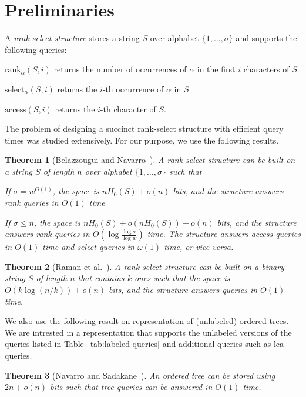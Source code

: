 \documentclass[12pt]{article}
\newtheorem{theorem}{Theorem}
\newcommand{\lcab}{\mathrm{lca}}
\newcommand{\rank}[3]{\mathrm{rank}_{#1}(#2,#3)}
\newcommand{\select}[3]{\mathrm{select}_{#1}(#2,#3)}
\newcommand{\access}[2]{\mathrm{access}(#1,#2)}
\newcommand{\range}[2]{\{#1,\ldots,#2\}}
\begin{document}
\section{Preliminaries}
A \emph{rank-select structure} stores a string $S$ over alphabet
$\range{1}{\sigma}$ and supports the following queries:
\begin{inparaenum}[(1)]
\item
$\rank{\alpha}{S}{i}$ returns the number of occurrences of $\alpha$ in the first
$i$ characters of $S$
\item
$\select{\alpha}{S}{i}$ returns the $i$-th occurrence of $\alpha$ in $S$
\item
$\access{S}{i}$ returns the $i$-th character of $S$.
\end{inparaenum}
The problem of designing a succinct rank-select structure with efficient query
times was studied extensively. For our purpose, we use the following results.
\begin{theorem}[Belazzougui and Navarro~\cite{BelazzouguiN12}]
\label{thm:rank-select}
A rank-select structure can be built on a string $S$ of length $n$
over alphabet $\range{1}{\sigma}$ such that
\begin{inparaenum}[(1)]
\item
If $\sigma=w^{O(1)}$, the space is $n H_0(S)+o(n)$ bits,
and the structure answers rank queries in $O(1)$ time
\item
If $\sigma \leq n$, the space is $n H_0(S)+o(n H_0(S))+o(n)$ bits,
and the structure answers rank queries
in $O(\log \frac{\log\sigma}{\log w})$ time.
The structure answers access queries in $O(1)$ time and select
queries in $\omega(1)$ time, or vice versa.
\end{inparaenum}
\end{theorem}
\begin{theorem}[Raman et al.~\cite{RamanRS07}]
\label{thm:rank-select-binary}
A rank-select structure can be built on a binary string $S$ of length $n$
that contains $k$ ones
such that the space is $O(k \log(n/k))+o(n)$ bits, and
the structure answers queries in $O(1)$ time.
\end{theorem}

We also use the following result on representation of (unlabeled) ordered trees.
We are intrested in a representation that supports
the unlabeled versions of the queries listed in Table~\ref{tab:labeled-queries}
and additional queries such as $\lcab$ queries.
\begin{theorem}[Navarro and Sadakane~\cite{NavarroS14}]
\label{thm:unlabeled-tree}
An ordered tree can be stored using $2n+o(n)$ bits such that
tree queries can be answered in $O(1)$ time.
\end{theorem}
\end{document}
